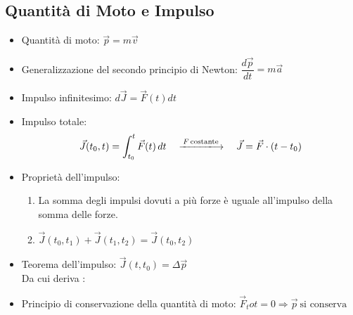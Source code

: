 \documentclass[10pt,a4paper]{article}
\newcommand{\deriv}[2][t]{\dfrac{d{#2}}{d{#1}}}
\begin{document}
	\subsection{Quantità di Moto e Impulso}
	\begin{itemize}
	\item Quantità di moto: \( \vec{p} = m\vec{v} \)
	\item Generalizzazione del secondo principio di Newton: \( \deriv{\vec{p}} = m\vec{a} \)
	\item Impulso infinitesimo: \( d\vec{J} = \vec{F}(t)dt \)
	\item Impulso totale: 
		\[ \vec{J}(t_0, t) = \int_{t_0}^{t}\vec{F}(t) \, dt \quad  \xlongrightarrow{ F \, \text{costante} \, } \quad \vec{J} = \vec{F}\cdot(t-t_0) \]
	\item Proprietà dell'impulso: 
		\begin{enumerate}
		\item La somma degli impulsi dovuti a più forze è uguale all'impulso della somma delle forze.
		\item \( \vec{J}(t_0, t_1) + \vec{J}(t_1, t_2) =  \vec{J}(t_0, t_2) \) 
		\end{enumerate}
	\item Teorema dell'impulso: \( \vec{J}(t, t_0) = \Delta\vec{p} \) \\
	Da cui deriva :
	\item Principio di conservazione della quantità di moto: \( \vec{F}_tot = 0 \Rightarrow \vec{p} \  \text{si conserva} \)
	\end{itemize}	

	\vspace{5mm}
\end{document}

